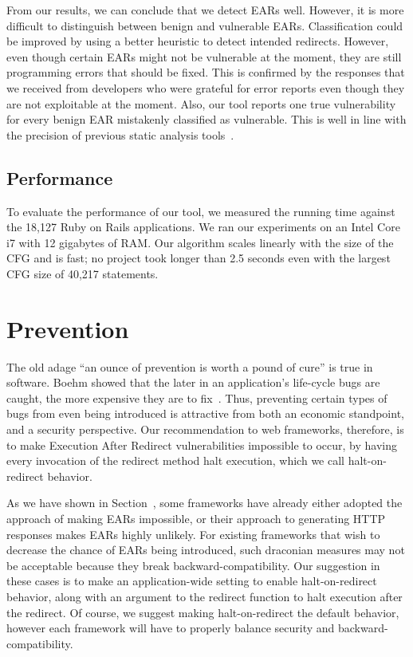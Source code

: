 From our results, we can conclude that we detect EARs well. However,
it is more difficult to distinguish between benign and vulnerable EARs.
Classification could be improved by using a better heuristic to detect
intended redirects. However, even though certain EARs might not be
vulnerable at the moment, they are still programming errors that
should be fixed. This is confirmed by the responses that we received
from developers who were grateful for error reports even though they
are not exploitable at the moment. Also, our tool reports one true
vulnerability for every benign EAR mistakenly classified as
vulnerable. This is well in line with the precision of previous static
analysis
tools~\cite{jovanovic06:pixy-short,huang04:securing,livshits05:java-static}.

\subsection{Performance}

To evaluate the performance of our tool, we measured the running time
against the 18,127 Ruby on Rails applications. We ran our experiments on an
Intel Core i7 with 12 gigabytes of RAM. Our algorithm scales linearly with
the size of the CFG and is fast; no project took longer than 2.5 seconds
even with the largest CFG size of 40,217 statements.

\section{Prevention}

The old adage ``an ounce of prevention is worth a pound of cure'' is true
in software. Boehm showed that the later in an application's life-cycle
bugs are caught, the more expensive they are to fix~\cite{boehm81:see}.
Thus, preventing certain types of bugs from even being introduced is
attractive from both an economic standpoint, and a security perspective. Our
recommendation to web frameworks, therefore, is to make Execution After
Redirect vulnerabilities impossible to occur, by having every invocation of
the redirect method halt execution, which we call halt-on-redirect
behavior.

As we have shown in Section~, some frameworks
have already either adopted the approach of making EARs impossible, or
their approach to generating HTTP responses makes EARs highly
unlikely. For existing frameworks that wish to decrease the chance of
EARs being introduced, such draconian measures may not be acceptable
because they break backward-compatibility. Our suggestion in these
cases is to make an application-wide setting to enable
halt-on-redirect behavior, along with an argument to the redirect
function to halt execution after the redirect. Of course, we suggest
making halt-on-redirect the default behavior, however each framework
will have to properly balance security and backward-compatibility.

